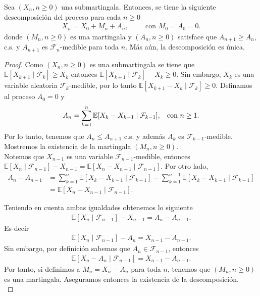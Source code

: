 \begin{theorem}
\label{descdoob}
	Sea $(X_n, n \geq 0)$ una submartingala. Entonces, se tiene la siguiente descomposición del proceso para cada $n \geq 0$
	\begin{align*}
	X_n = X_0 + M_n + A_n, \hspace{1cm} \text{con    } M_0 = A_0 = 0.
	\end{align*}
	donde $(M_n, n \geq 0)$ es una martingala y $(A_n, n \geq 0)$ satisface que $A_{n+1} \geq A_n$, c.s. y $A_{n+1}$ es $\mathcal{F}_n$-medible para toda $n$. Más aún, la descomposición es única.
\end{theorem}
\begin{proof}
	Como $(X_n, n \geq 0)$ es una submartingala se tiene que $\mathbb{E}[X_{k+1} \mid \mathcal{F}_k] \geq X_k$ entonces $\mathbb{E}[X_{k+1} \mid \mathcal{F}_k] - X_k \geq 0$. Sin embargo, $X_k$ es una variable aleatoria $\mathcal{F}_k$-medible, por lo tanto $\mathbb{E}[X_{k+1} - X_k \mid \mathcal{F}_k] \geq 0$.
	Definamos al proceso $A_0 = 0$ y
	\begin{align*}
	A_n = \sum_{k=1}^{n} \mathbb{E}[X_k - X_{k-1} \mid \mathcal{F}_{k-1}], \hspace{0.3cm} \text{con } n \geq 1.
	\end{align*}
	Por lo tanto, tenemos que $A_n \leq A_{n+1}$ c.s. y además $A_k$ es $\mathcal{F}_{k-1}$-medible. Mostremos la existencia de la martingala $(M_n, n \geq 0)$. \\
	
	Notemos que $X_{n-1}$ es una variable $\mathcal{F}_{n-1}$-medible, entonces $\mathbb{E}[X_n \mid \mathcal{F}_{n-1}] - X_{n-1} = \mathbb{E}[X_n - X_{n-1} \mid \mathcal{F}_{n-1}]$. Por otro lado, 
	\begin{align*}
	A_n - A_{n-1} & = \sum_{k=1}^{n} \mathbb{E}[X_k - X_{k-1} \mid \mathcal{F}_{k-1}] - \sum_{k=1}^{n-1} \mathbb{E}[X_k - X_{k-1} \mid \mathcal{F}_{k-1}] \\
	& = \mathbb{E}[X_n - X_{n-1} \mid \mathcal{F}_{n-1}]. 
	\end{align*}
	
	\noindent Teniendo en cuenta ambas igualdades obtenemos lo siguiente
	\begin{align*}
		\mathbb{E}[X_n \mid \mathcal{F}_{n-1}] - X_{n-1} = A_n - A_{n-1}.
	\end{align*}
	Es decir
	\begin{align*}
		\mathbb{E}[X_n \mid \mathcal{F}_{n-1}] - A_n = X_{n-1} - A_{n-1}.
	\end{align*}
	Sin embargo, por definición sabemos que $A_n \in \mathcal{F}_{n-1}$, entonces 
	\begin{align*}
		\mathbb{E}[X_n - A_n \mid \mathcal{F}_{n-1}] = X_{n-1} - A_{n-1}.
	\end{align*}
	Por tanto, si definimos a $M_n = X_n - A_n$ para toda $n$, tenemos que $(M_n, n \geq 0)$ es una martingala. Aseguramos entonces la existencia de la descomposición. \\
	

\end{proof}
